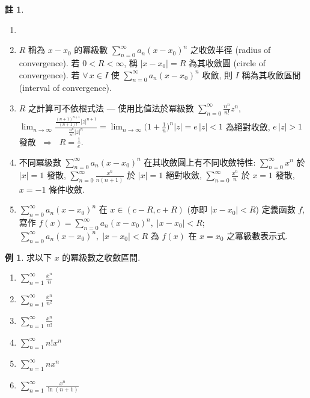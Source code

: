 \documentclass[12pt]{extarticle}
\newcommand{\ds}{\displaystyle}
\newcommand{\ie}{\;\Longrightarrow\;}
\theoremstyle{definition}
\newtheorem*{ex}{例}
\newtheorem*{rmk}{註}
\begin{document}
\begin{rmk}
  \begin{enumerate}\setlength{\itemsep}{0pt}
    \item[]
    \item $R$ 稱為 $x - x_0$ 的冪級數 $\ds\sum_{n = 0}^\infty a_n (x - x_0)^n$ 之收斂半徑 (radius of convergence). 若 $0 < R < \infty$, 稱 $|x - x_0| = R$ 為其收斂圓 (circle of convergence). 若 $\forall\,x\in I$ 使 $\ds\sum_{n = 0}^\infty a_n (x - x_0)^n$ 收斂, 則 $I$ 稱為其收斂區間 (interval of convergence). 
    \item $R$ 之計算可不依根式法 --- 使用比值法於冪級數 $\ds\sum_{n = 0}^\infty\frac{n^n}{n!}z^n$, $\ds\lim_{n\to\infty}\frac{\frac{(n + 1)^{n + 1}}{(n + 1)!}|z|^{n + 1}}{\frac{n^n}{n!}|z|^n} = \lim_{n\to\infty}\Big(1 + \frac{1}{n}\Big)^n|z| = e\,|z| < 1$ 為絕對收斂, $\ds e\,|z| > 1$ 發散 $\ie$ $\ds R = \frac{1}{e}$. 
    \item 不同冪級數 $\ds\sum_{n = 0}^\infty a_n (x - x_0)^n$ 在其收斂圓上有不同收斂特性:  $\ds\sum_{n = 0}^\infty x^n$ 於 $|x| = 1$ 發散, $\ds\sum_{n = 0}^\infty\frac{x^n}{n(n + 1)}$ 於 $|x| = 1$ 絕對收斂, $\ds\sum_{n = 0}^\infty\frac{x^n}{n}$ 於 $x = 1$ 發散, $x = -1$ 條件收斂. 
    \item $\ds\sum_{n = 0}^\infty a_n (x - x_0)^n$ 在 $\ds x\in(c - R, c + R)$ (亦即 $|x - x_0| < R$) 定義函數 $f$, 寫作 $\ds f(x) = \sum_{n = 0}^\infty a_n (x - x_0)^n,\;|x - x_0| < R$; $\ds\sum_{n = 0}^\infty a_n (x - x_0)^n,\;|x - x_0| < R$ 為 $f(x)$ 在 $x = x_0$ 之冪級數表示式.  
  \end{enumerate}
\end{rmk}

\begin{ex} 求以下 $x$ 的冪級數之收斂區間. 
  \begin{multicols}{3}
    \begin{enumerate}\setlength{\itemsep}{0pt}
      \item $\ds\sum_{n = 1}^\infty\frac{x^n}{n}$
      \item $\ds\sum_{n = 1}^\infty\frac{x^n}{n^2}$
      \item $\ds\sum_{n = 1}^\infty\frac{x^n}{n!}$
      \item $\ds\sum_{n = 1}^\infty n!x^n$
      \item $\ds\sum_{n = 1}^\infty n x^n$
      \item $\ds\sum_{n = 1}^\infty\frac{x^n}{\ln(n + 1)}$
    \end{enumerate}
  \end{multicols}
\end{ex}
\end{document}
